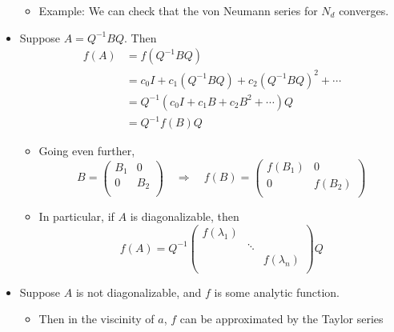 \documentclass[../notes.tex]{subfiles}
\begin{document}
\begin{itemize}
    \begin{itemize}
        \item Example: We can check that the von Neumann series for $N_d$ converges.
    \end{itemize}
    \item Suppose $A=Q^{-1}BQ$. Then
    \begin{align*}
        f(A) &= f(Q^{-1}BQ)\\
        &= c_0I+c_1(Q^{-1}BQ)+c_2(Q^{-1}BQ)^2+\cdots\\
        &= Q^{-1}(c_0I+c_1B+c_2B^2+\cdots)Q\\
        &= Q^{-1}f(B)Q
    \end{align*}
    \begin{itemize}
        \item Going even further,
        \begin{equation*}
            B =
            \begin{pmatrix}
                B_1 & 0\\
                0 & B_2\\
            \end{pmatrix}
            \quad\Longrightarrow\quad
            f(B) =
            \begin{pmatrix}
                f(B_1) & 0\\
                0 & f(B_2)\\
            \end{pmatrix}
        \end{equation*}
        \item In particular, if $A$ is diagonalizable, then
        \begin{equation*}
            f(A) = Q^{-1}
            \begin{pmatrix}
                f(\lambda_1) &  & \\
                 & \ddots & \\
                 &  & f(\lambda_n)\\
            \end{pmatrix}
            Q
        \end{equation*}
    \end{itemize}
    \item Suppose $A$ is not diagonalizable, and $f$ is some analytic function.
    \begin{itemize}
        \item Then in the viscinity of $a$, $f$ can be approximated by the Taylor series
        \begin{equation*}

\end{equation*}
\end{itemize}
\end{itemize}
\end{document}
